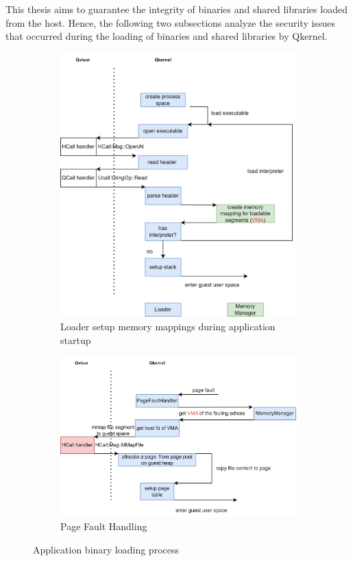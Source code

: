 This thesis aims to guarantee the integrity of binaries and shared libraries loaded from the host. Hence, the following two subsections analyze the security issues that occurred during the loading of binaries and shared libraries by Qkernel.

\begin{figure}[ht] 
  \begin{subfigure}[b]{0.5\linewidth}
    \centering
    \includegraphics[width=0.9\linewidth]{images/loader_flow.png} 
    \caption{Loader setup memory mappings during application startup} 
    \label{fig2:a} 
    \vspace{4ex}
  \end{subfigure}%
  \begin{subfigure}[b]{0.5\linewidth}
    \centering
    \includegraphics[width=0.9\linewidth]{images/page_fault_handling.png} 
    \caption{Page Fault Handling} 
    \label{fig2:b} 
    \vspace{4ex}
  \end{subfigure} 
  \caption{Application binary loading process}
  \label{fig2} 
\end{figure}

